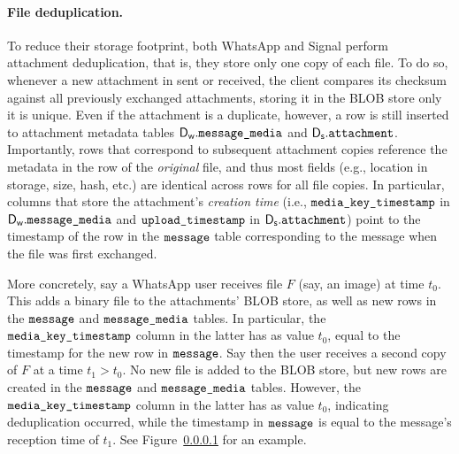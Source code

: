\paragraph{File deduplication.} To reduce their storage footprint, both WhatsApp and Signal perform attachment deduplication, that is, they store only one copy of each file. To do so, whenever a new attachment in sent or received, the client compares its checksum against all previously exchanged attachments, storing it in the BLOB store only it is unique. Even if the attachment is a duplicate, however, a row is still inserted to attachment metadata tables $\textsf{D}_{\textsf{w}}.\texttt{message\_media}$ and $\textsf{D}_{\textsf{s}}.\texttt{attachment}$. Importantly, rows that correspond to subsequent attachment copies reference the metadata in the row of the \emph{original} file, and thus most fields (e.g., location in storage, size, hash, etc.) are identical across rows for all file copies. In particular, columns that store the attachment's \emph{creation time} (i.e., $\texttt{media\_key\_timestamp}$ in $\textsf{D}_{\textsf{w}}.\texttt{message\_media}$ and $\texttt{upload\_timestamp}$ in $\textsf{D}_{\textsf{s}}.\texttt{attachment}$) point to the timestamp of the row in the $\texttt{message}$ table corresponding to the message when the file was first exchanged.

More concretely, say a WhatsApp user receives file $F$ (say, an image) at time $t_0$. This adds a binary file to the attachments' BLOB store, as well as new rows in the $\texttt{message}$ and $\texttt{message\_media}$ tables. In particular, the $\texttt{media\_key\_timestamp}$ column in the latter has as value $t_0$, equal to the timestamp for the new row in $\texttt{message}$. Say then the user receives a second copy of $F$ at a time $t_1 > t_0$. No new file is added to the BLOB store, but new rows are created in the $\texttt{message}$ and $\texttt{message\_media}$ tables. However, the $\texttt{media\_key\_timestamp}$ column in the latter has as value $t_0$, indicating deduplication occurred, while the timestamp in $\texttt{message}$ is equal to the message's reception time of $t_1$. 
See Figure~\ref{} for an example.


